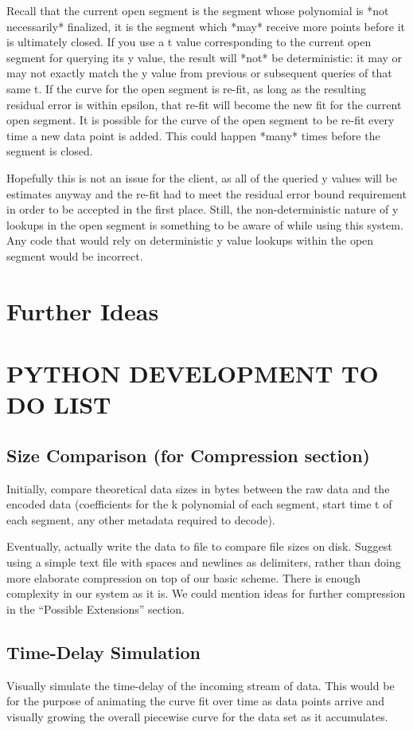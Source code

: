 \documentclass{article}
\begin{document}
Recall that the current open segment is the segment whose polynomial is *not necessarily* finalized, it is the segment which *may* receive more points before it is ultimately closed. If you use a t value corresponding to the current open segment for querying its y value, the result will *not* be deterministic: it may or may not exactly match the y value from previous or subsequent queries of that same t.
If the curve for the open segment is re-fit, as long as the resulting residual error is within epsilon, that re-fit will become the new fit for the current open segment. It is possible for the curve of the open segment to be re-fit every time a new data point is added. This could happen *many* times before the segment is closed.

Hopefully this is not an issue for the client, as all of the queried y values will be estimates anyway and the re-fit had to meet the residual error bound requirement in order to be accepted in the first place. Still, the non-deterministic nature of y lookups in the open segment is something to be aware of while using this system. Any code that would rely on deterministic y value lookups within the open segment would be incorrect.


\section{Further Ideas}


\section{PYTHON DEVELOPMENT TO DO LIST}

\subsection{Size Comparison (for Compression section)}
Initially, compare theoretical data sizes in bytes between the raw data and the encoded data (coefficients for the k polynomial of each segment, start time t of each segment, any other metadata required to decode).

Eventually, actually write the data to file to compare file sizes on disk. Suggest using a simple text file with spaces and newlines as delimiters, rather than doing more elaborate compression on top of our basic scheme. There is enough complexity in our system as it is.
We could mention ideas for further compression in the “Possible Extensions” section.

\subsection{Time-Delay Simulation}
Visually simulate the time-delay of the incoming stream of data. This would be for the purpose of animating the curve fit over time as data points arrive and visually growing the overall piecewise curve for the data set as it accumulates.
\end{document}
